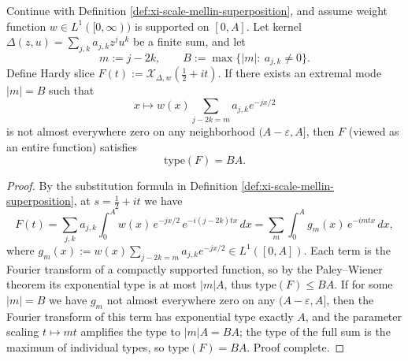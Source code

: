 \begin{conclusion}\label{con:xi-terminal-scale-superposition-exact-type-rigidity}
Continue with Definition \ref{def:xi-scale-mellin-superposition}, and assume weight function \(w\in L^{1}([0,\infty))\) is supported on \([0,A]\).
Let kernel \(\Delta(z,u)=\sum_{j,k}a_{j,k}z^{j}u^{k}\) be a finite sum, and let
\[
m:=j-2k,\qquad
B:=\max\{|m|:\ a_{j,k}\neq 0\}.
\]
Define Hardy slice
\(
F(t):=\mathcal X_{\Delta,w}(\tfrac12+it)
\).
If there exists an extremal mode \(|m|=B\) such that
\[
x\longmapsto w(x)\sum_{j-2k=m}a_{j,k}e^{-jx/2}
\]
is not almost everywhere zero on any neighborhood \((A-\varepsilon,A]\), then \(F\) (viewed as an entire function) satisfies
\[
\mathrm{type}(F)=BA.
\]
\end{conclusion}
\begin{proof}[Proof]
By the substitution formula in Definition \ref{def:xi-scale-mellin-superposition}, at \(s=\tfrac12+it\) we have
\[
F(t)=\sum_{j,k}a_{j,k}\int_{0}^{A} w(x)\,e^{-jx/2}\,e^{-i(j-2k)tx}\,dx
=\sum_{m}\int_{0}^{A} g_m(x)\,e^{-imtx}\,dx,
\]
where
\(
g_m(x):=w(x)\sum_{j-2k=m}a_{j,k}e^{-jx/2}\in L^{1}([0,A])
\).
Each term is the Fourier transform of a compactly supported function, so by the Paley--Wiener theorem its exponential type is at most \(|m|A\), thus \(\mathrm{type}(F)\le BA\).
If for some \(|m|=B\) we have \(g_m\) not almost everywhere zero on any \((A-\varepsilon,A]\), then the Fourier transform of this term has exponential type exactly \(A\),
and the parameter scaling \(t\mapsto mt\) amplifies the type to \(|m|A=BA\); the type of the full sum is the maximum of individual types, so \(\mathrm{type}(F)=BA\). Proof complete.
\end{proof}

